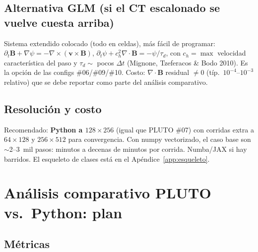 \documentclass[11pt,a4paper]{article}
\newcommand{\B}{\mathbf{B}}
\newcommand{\vct}{\mathbf{v}}
\begin{document}
\subsection{Alternativa GLM (si el CT escalonado se vuelve cuesta arriba)}

Sistema extendido colocado (todo en celdas), más fácil de programar:
$\partial_t\B+\nabla\psi=-\nabla\times(\vct\times\B)$,
$\partial_t\psi+c_h^2\nabla\cdot\B=-\psi/\tau_d$,
con $c_h=\max$ velocidad característica del paso y $\tau_d\sim$ pocos $\Delta t$
(Mignone, Tzeferacos \& Bodo 2010). Es la opción de las configs \#06/\#09/\#10.
Costo: $\nabla\cdot\B$ residual $\neq0$ (típ.\ $10^{-4}$--$10^{-3}$ relativo) que se debe
reportar como parte del análisis comparativo.

\subsection{Resolución y costo}

Recomendado: \textbf{Python a $128\times256$} (igual que PLUTO \#07) con corridas extra a
$64\times128$ y $256\times512$ para convergencia. Con numpy vectorizado, el caso base son
$\sim$2--3~mil pasos: minutos a decenas de minutos por corrida. Numba/JAX si hay barridos.
El esqueleto de clases está en el Apéndice~\ref{app:esqueleto}.

\section{Análisis comparativo PLUTO vs.\ Python: plan}
\label{sec:comparativo}

\subsection{Métricas}
\end{document}
